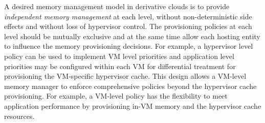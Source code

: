 %
%
A desired memory management model in derivative clouds is to
provide {\em independent memory management} at each level,
without non-deterministic side effects and without loss of
hypervisor control.
%
The provisioning policies at each level should be mutually
exclusive and at the same time allow each hosting entity
to influence the memory provisioning decisions.
%
For example, a hypervisor level policy can be used to 
implement VM level priorities and application level priorities 
may be configured within each VM for differential treatment
for provisioning the VM-specific hypervisor cache. 
%
This design allows a VM-level memory manager to
enforce comprehensive policies beyond the hypervisor cache 
provisioning.
%
For example, a VM-level policy has the flexibility to meet
application performance by provisioning in-VM memory and the
hypervisor cache resources.  
%

